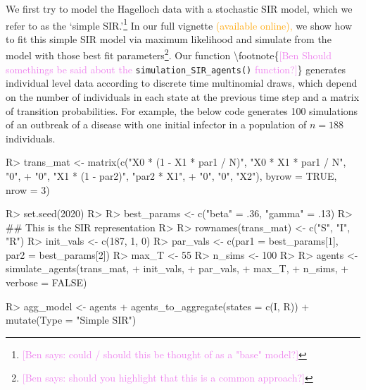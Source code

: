 \documentclass[
  shortnames]{jss}
\begin{document}
We first try to model the Hagelloch data with a stochastic SIR model,
which we refer to as the `simple
SIR.'\footnote{\textcolor{violet}{[Ben says: could / should this be thought of as a "base" model?]}}
In our full vignette \textcolor{orange}{(available online),} we show how
to fit this simple SIR model via maximum likelihood and simulate from
the model with those best fit
parameters\footnote{\textcolor{violet}{[Ben says: should you highlight that this is a common approach?]}}.
Our function
\textbackslash footnote\{\textcolor{violet}{[Ben Should somethings be said about the }
\texttt{simulation\_SIR\_agents()} \textcolor{violet}{function?]}\}
generates individual level data according to discrete time multinomial
draws, which depend on the number of individuals in each state at the
previous time step and a matrix of transition probabilities. For
example, the below code generates 100 simulations of an outbreak of a
disease with one initial infector in a population of \(n= 188\)
individuals.

\begin{CodeChunk}
\begin{CodeInput}
R> trans_mat <- matrix(c("X0 * (1 - X1 * par1 / N)", "X0 * X1  * par1 / N", "0",
+                   "0", "X1 * (1 - par2)", "par2 * X1",
+                   "0", "0", "X2"), byrow = TRUE, nrow = 3)
\end{CodeInput}
\end{CodeChunk}

\begin{CodeChunk}
\begin{CodeInput}
R> set.seed(2020)
R> 
R> best_params <- c("beta" = .36, "gamma" = .13)
R> ## This is the SIR representation
R> 
R> rownames(trans_mat) <- c("S", "I", "R")
R> init_vals <- c(187, 1, 0)
R> par_vals <- c(par1 = best_params[1], par2 = best_params[2])
R> max_T <- 55
R> n_sims <- 100
R> 
R> agents <- simulate_agents(trans_mat,
+                        init_vals,
+                        par_vals,
+                        max_T,
+                        n_sims,
+                        verbose = FALSE)
\end{CodeInput}
\end{CodeChunk}

\begin{CodeChunk}
\begin{CodeInput}
R> agg_model <- agents %
+   agents_to_aggregate(states = c(I, R)) %
+   mutate(Type = "Simple SIR")
\end{CodeInput}
\end{CodeChunk}
\end{document}

